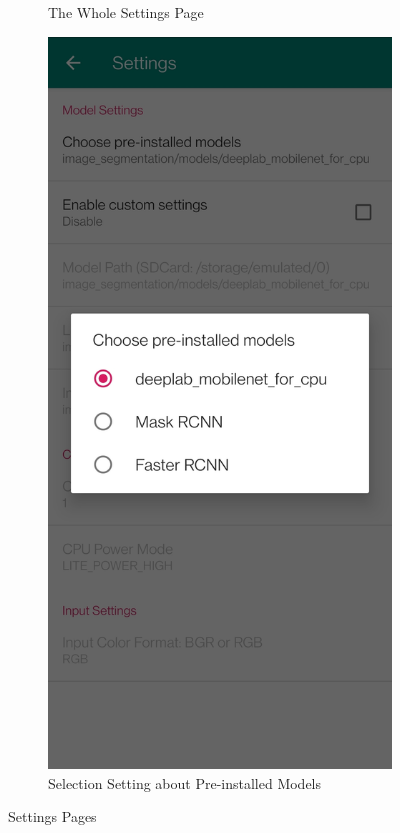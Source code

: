 \begin{figure}[htbp]
\begin{subfigure}[t]{0.4\linewidth}
        \caption{The Whole Settings Page}\label{settings}
    \end{subfigure}
    \begin{subfigure}[t]{0.4\linewidth}
        \includegraphics[width=1\textwidth]{figures/type.jpg}
        \caption{Selection Setting about Pre-installed Models}\label{type}
    \end{subfigure}
    \caption{Settings Pages}\label{result1}
\end{figure}


